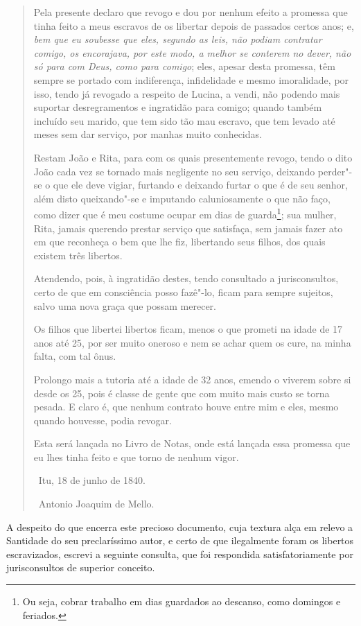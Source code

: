 \begin{quote}
Pela presente declaro que revogo e dou por nenhum efeito a promessa que
tinha feito a meus escravos de os libertar depois de passados certos
anos; e, \emph{bem que eu soubesse que eles, segundo as leis, não podiam
contratar comigo, os encorajava, por este modo, a melhor se conterem no
dever, não só para com Deus, como para comigo}; eles, apesar desta
promessa, têm sempre se portado com indiferença, infidelidade e mesmo
imoralidade, por isso, tendo já revogado a respeito de Lucina, a vendi,
não podendo mais suportar desregramentos e ingratidão para comigo;
quando também incluído seu marido, que tem sido tão mau escravo, que tem
levado até meses sem dar serviço, por manhas muito conhecidas.

Restam João e Rita, para com os quais presentemente revogo, tendo o dito
João cada vez se tornado mais negligente no seu serviço, deixando
perder"-se o que ele deve vigiar, furtando e deixando furtar o que é de
seu senhor, além disto queixando"-se e imputando caluniosamente o que não
faço, como dizer que é meu costume ocupar em dias de guarda\footnote{
  Ou seja, cobrar trabalho em dias guardados ao descanso, como domingos
  e feriados.}; sua mulher, Rita, jamais querendo prestar serviço que
satisfaça, sem jamais fazer ato em que reconheça o bem que lhe fiz,
libertando seus filhos, dos quais existem três libertos.

Atendendo, pois, à ingratidão destes, tendo consultado a jurisconsultos,
certo de que em consciência posso fazê"-lo, ficam para sempre sujeitos,
salvo uma nova graça que possam merecer.

Os filhos que libertei libertos ficam, menos o que prometi na idade de
17 anos até 25, por ser muito oneroso e nem se achar quem os cure, na
minha falta, com tal ônus.

Prolongo mais a tutoria até a idade de 32 anos, emendo o viverem sobre
si desde os 25, pois é classe de gente que com muito mais custo se torna
pesada. E claro é, que nenhum contrato houve entre mim e eles, mesmo
quando houvesse, podia revogar.

Esta será lançada no Livro de Notas, onde está lançada essa promessa que
eu lhes tinha feito e que torno de nenhum vigor.

\hfill\ Itu, 18 de junho de 1840.\smallskip

\hfill\ Antonio Joaquim de Mello.
\end{quote}

A despeito do que encerra este precioso documento, cuja textura alça em
relevo a Santidade do seu preclaríssimo autor, e certo de que
ilegalmente foram os libertos escravizados, escrevi a seguinte consulta,
que foi respondida satisfatoriamente por jurisconsultos de superior
conceito.

